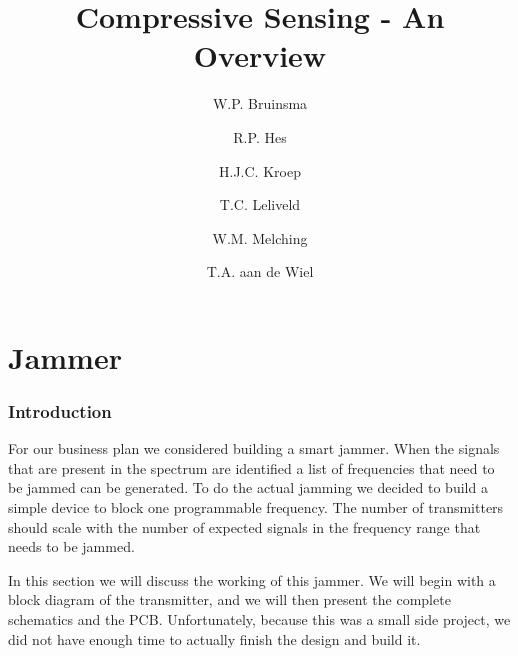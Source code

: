 \documentclass[a4paper, openany, oneside]{memoir}
\title{Compressive Sensing - An Overview}
\author{W.P. Bruinsma \and R.P. Hes \and H.J.C. Kroep \and T.C. Leliveld \and W.M. Melching \and T.A. aan de Wiel}
\begin{document}
\chapter{Jammer}
\label{cha:jammer}

\subsection{Introduction}
For our business plan we considered building a smart jammer. When the signals that are present in the spectrum are identified a list of frequencies that need to be jammed can be generated. To do the actual jamming we decided to build a simple device to block one programmable frequency. The number of transmitters should scale with the number of expected signals in the frequency range that needs to be jammed.

In this section we will discuss the working of this jammer. We will begin with a block diagram of the transmitter, and we will then present the complete schematics and the PCB\@. Unfortunately, because this was a small side project, we did not have enough time to actually finish the design and build it.
\end{document}
